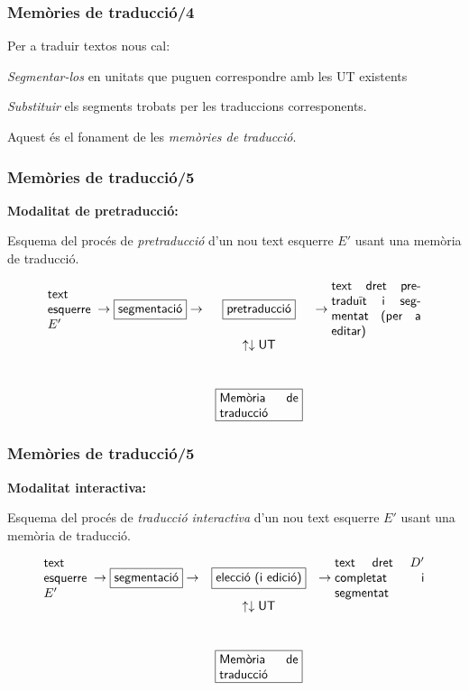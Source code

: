 \documentclass{beamer}
\newcommand{\empha}[1]{\emph{#1}\/}
\begin{document}
\begin{frame}

\frametitle{ Memòries de traducció/4}
{
{Per a traduir textos nous cal:}
\begin{itemize}\setlength{\itemsep}{0pt}
{\item \empha{Segmentar-los} en unitats que puguen 
correspondre amb les UT existents}
{\item \empha{Substituir} els segments trobats per les 
traduccions corresponents.}
\end{itemize}
{Aquest és el fonament de les \empha{memòries de 
traducció}.}

}

\end{frame}

\begin{frame}

\frametitle{ Memòries de traducció/5}

\textbf{Modalitat de pretraducció:}

Esquema del procés de \empha{pretraducció} d'un nou text esquerre $E'$
usant una memòria de traducció.

$$
\begin{array}{rcl}
\mbox{\parbox{1.3cm}{\textsf{text esquerre $E'$}}} \to
\mbox{\framebox{\textsf{segmentació}}} \to &
\mbox{\framebox{\textsf{pretraducció}}} & \to \mbox{\parbox{2.5cm}{\textsf{text dret
    pretraduït i segmentat (per a editar)}}} \\
& \uparrow \downarrow \mbox{\textsf{UT}}& \\[1cm]
& \mbox{\framebox{\parbox{2.2cm}{\textsf{Memòria de traducció}}}} & \\
\end{array}
$$
\end{frame}
\begin{frame}

\frametitle{ Memòries de traducció/5}

\textbf{Modalitat interactiva:}

Esquema del procés de \empha{traducció interactiva} d'un nou text esquerre $E'$
usant una memòria de traducció.

$$
\begin{array}{rcl}
\mbox{\parbox{1.3cm}{\textsf{text esquerre $E'$}}} \to
\mbox{\framebox{\textsf{segmentació}}} \to &
\mbox{\framebox{\textsf{elecció (i edició)}}} & \to \mbox{\parbox{2.5cm}{\textsf{text dret \(D'\)
    completat i segmentat}}} \\
& \uparrow \downarrow \mbox{\textsf{UT}}& \\[1cm]
& \mbox{\framebox{\parbox{2.2cm}{\textsf{Memòria de traducció}}}} & \\
\end{array}
$$
\end{frame}
\end{document}
